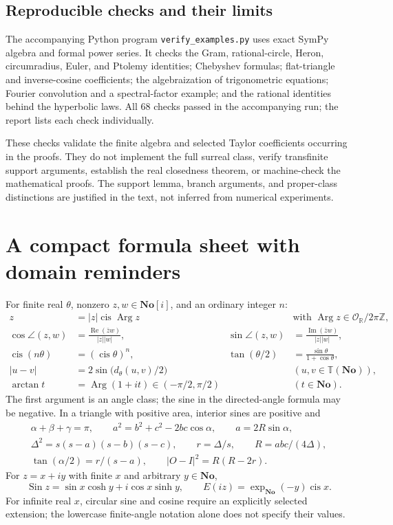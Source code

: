 \documentclass[11pt]{article}
\numberwithin{equation}{section}
\theoremstyle{definition}
\newcommand{\No}{\mathbf{No}}
\newcommand{\SC}{\mathbf{No}[i]}
\newcommand{\R}{\mathbb R}
\newcommand{\Z}{\mathbb Z}
\newcommand{\OO}{\mathcal O}
\newcommand{\TT}{\mathbb T}
\newcommand{\re}{\operatorname{Re}}
\newcommand{\im}{\operatorname{Im}}
\newcommand{\cis}{\operatorname{cis}}
\newcommand{\Arg}{\operatorname{Arg}}
\newcommand{\Sin}{\operatorname{Sin}}
\newcommand{\ang}[2]{\angle(#1,#2)}
\begin{document}
\subsection{Reproducible checks and their limits}
The accompanying Python program \texttt{verify\_examples.py} uses exact SymPy algebra and formal power series. It checks the Gram, rational-circle, Heron, circumradius, Euler, and Ptolemy identities; Chebyshev formulas; flat-triangle and inverse-cosine coefficients; the algebraization of trigonometric equations; Fourier convolution and a spectral-factor example; and the rational identities behind the hyperbolic laws. All 68 checks passed in the accompanying run; the report lists each check individually.

These checks validate the finite algebra and selected Taylor coefficients occurring in the proofs. They do not implement the full surreal class, verify transfinite support arguments, establish the real closedness theorem, or machine-check the mathematical proofs. The support lemma, branch arguments, and proper-class distinctions are justified in the text, not inferred from numerical experiments.

\appendix
\section{A compact formula sheet with domain reminders}\label{app:formulas}
For finite real $\theta$, nonzero $z,w\in\SC$, and an ordinary integer $n$:
\begin{align*}
 z&=|z|\cis\Arg z &&\text{with }\Arg z\in\OO_{\R}/2\pi\Z,\\
 \cos\ang zw&=\frac{\re(\bar zw)}{|z||w|},&
 \sin\ang zw&=\frac{\im(\bar zw)}{|z||w|},\\
 \cis(n\theta)&=(\cis\theta)^n,&
 \tan(\theta/2)&=\frac{\sin\theta}{1+\cos\theta},\\
 |u-v|&=2\sin\bigl(d_\theta(u,v)/2\bigr)&& (u,v\in\TT(\No)),\\
 \arctan t&=\Arg(1+it)\in(-\pi/2,\pi/2)&& (t\in\No).
\end{align*}
The first argument is an angle class; the sine in the directed-angle formula may be negative. In a triangle with positive area, interior sines are positive and
\begin{gather*}
 \alpha+\beta+\gamma=\pi,\qquad
 a^2=b^2+c^2-2bc\cos\alpha,\qquad
 a=2R\sin\alpha,\\
 \Delta^2=s(s-a)(s-b)(s-c),\qquad
 r=\Delta/s,\qquad R=abc/(4\Delta),\\
 \tan(\alpha/2)=r/(s-a),\qquad |O-I|^2=R(R-2r).
\end{gather*}
For $z=x+iy$ with finite $x$ and arbitrary $y\in\No$,
\[
 \Sin z=\sin x\cosh y+i\cos x\sinh y,
 \qquad E(iz)=\exp_{\No}(-y)\cis x.
\]
For infinite real $x$, circular sine and cosine require an explicitly selected extension; the lowercase finite-angle notation alone does not specify their values.
\end{document}
